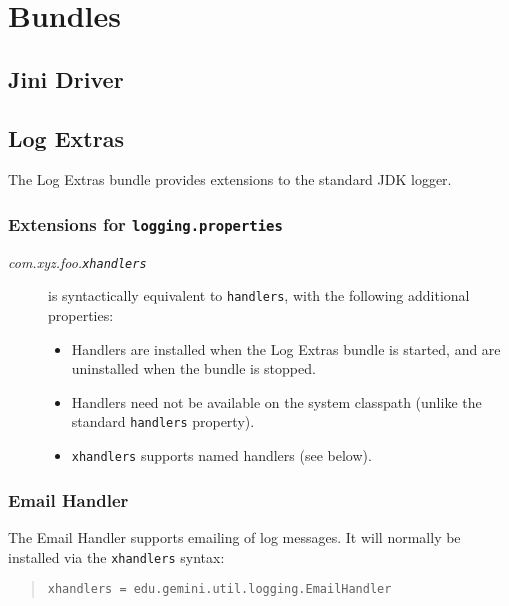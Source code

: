 \documentclass{report}
\begin{document}
\section{Bundles}

\subsection{Jini Driver}

\subsection{Log Extras}

The Log Extras bundle provides extensions to the standard JDK logger.

\subsubsection{Extensions for \tt logging.properties}

\begin{description}

\item[\it com.xyz.foo.\tt xhandlers] is syntactically equivalent to 
{\tt handlers}, with the following additional properties:
	\begin{itemize}
    \item Handlers are installed when the Log Extras bundle is started, and 
    are uninstalled when the bundle is stopped.
    \item Handlers need not be available on the system classpath (unlike the
    standard {\tt handlers} property).
    \item {\tt xhandlers} supports named handlers (see below).
    \end{itemize}

\end{description}

\subsubsection{Email Handler}

The Email Handler supports emailing of log messages. It will normally be
installed via the {\tt xhandlers} syntax:

\begin{quote}\begin{scriptsize}\begin{verbatim}
xhandlers = edu.gemini.util.logging.EmailHandler
\end{verbatim}\end{scriptsize}\end{quote}
\end{document}
